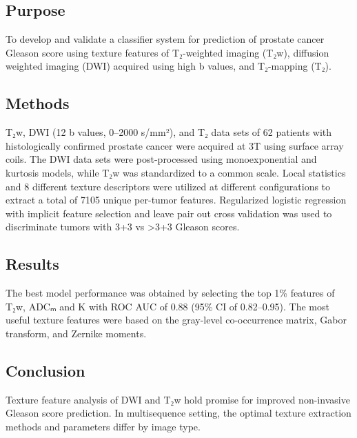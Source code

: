 
\subsection*{Purpose}

To develop and validate a classifier system for prediction of prostate cancer
Gleason score using texture features of T₂-weighted imaging (T₂w), diffusion
weighted imaging (DWI) acquired using high b values, and T₂-mapping (T₂).


\subsection*{Methods}

T₂w, DWI (12 b values, 0--2000 s/mm²), and T₂ data sets of 62 patients with
histologically confirmed prostate cancer were acquired at 3T using surface array
coils. The DWI data sets were post-processed using monoexponential and kurtosis
models, while T₂w was standardized to a common scale. Local statistics and 8
different texture descriptors were utilized at different configurations to
extract a total of 7105 unique per-tumor features. Regularized logistic
regression with implicit feature selection and leave pair out cross validation
was used to discriminate tumors with 3+3 vs >3+3 Gleason scores.


\subsection*{Results}

The best model performance was obtained by selecting the top 1\% features of
T₂w, ADCₘ and K with ROC AUC of 0.88 (95\% CI of 0.82--0.95). The most useful
texture features were based on the gray-level co-occurrence matrix, Gabor
transform, and Zernike moments.


\subsection*{Conclusion}

Texture feature analysis of DWI and T₂w hold promise for improved non-invasive
Gleason score prediction. In multisequence setting, the optimal texture
extraction methods and parameters differ by image type.
